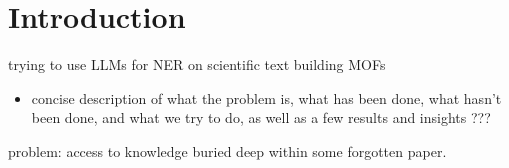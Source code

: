 \chapter{Introduction}\label{chap:introduction}

trying to use \glspl{LLM} for \gls{NER} on scientific text building \glspl{MOF}

\begin{itemize}
    \item concise description of what the problem is, what has been done, what hasn't been done, and what we try to do, as well as a few results and insights ???
\end{itemize}

problem: access to knowledge buried deep within some forgotten paper.



